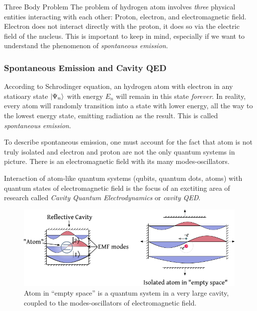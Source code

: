 \begin{mybio}{Three Body Problem}
	The problem of hydrogen atom involves \emph{three} physical entities
	interacting with each other: Proton, electron, and electromagnetic
	field. Electron does not interact directly with the proton, it does
	so via the electric field of the nucleus. This is important to keep
	in mind, especially if we want to understand the phenomenon of
	\emph{spontaneous emission}.
\end{mybio}
\subsubsection{Spontaneous Emission and Cavity QED}
According to Schrodinger equation, an hydrogen atom with electron in any
statioary state $|{\Psi_n}\rangle$ with energy $E_n$ will remain in this
state \emph{forever}. In reality, every atom will randomly transition
into a state with lower energy, all the way to the lowest energy
state, emitting radiation as the result. This is called \emph{spontaneous
	emission}.

To describe spontaneous emission, one must account for the fact that
atom is not truly isolated and electron and proton are not the only
quantum systems in picture. There is an electromagnetic field with its
many modes-oscillators.

Interaction of atom-like quantum systems (qubits, quantum dots, atoms)
with quantum states of electromagnetic field is the focus of an exctiting
area of research called \emph{Cavity Quantum Electrodynamics} or \emph{cavity QED}.
\begin{figure}[htbp]
	\centering
	\includegraphics[scale=1.0]{cavityQED}
	\caption{Atom in ``empty space'' is a quantum system in a very large
		cavity, coupled to the modes-oscillators of electromagnetic field.}
	\label{fig:cavityQED}
\end{figure}

